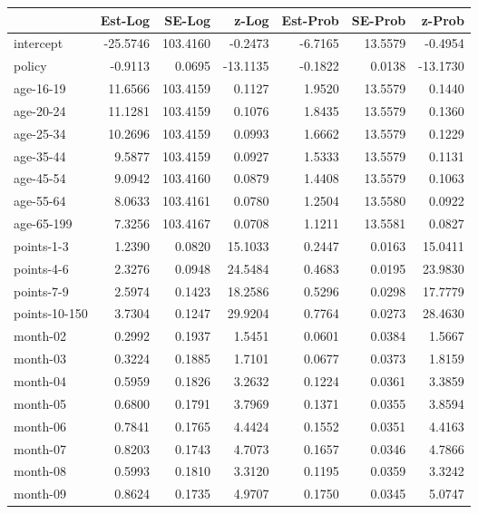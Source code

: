 \documentclass[10pt]{article}
\begin{document}
\begin{table}[ht]
\centering
\begin{tabular}{lrrrrrr}
  \hline
 & Est-Log & SE-Log & z-Log & Est-Prob & SE-Prob & z-Prob \\ 
  \hline
intercept & -25.5746 & 103.4160 & -0.2473 & -6.7165 & 13.5579 & -0.4954 \\ 
  policy & -0.9113 & 0.0695 & -13.1135 & -0.1822 & 0.0138 & -13.1730 \\ 
  age-16-19 & 11.6566 & 103.4159 & 0.1127 & 1.9520 & 13.5579 & 0.1440 \\ 
  age-20-24 & 11.1281 & 103.4159 & 0.1076 & 1.8435 & 13.5579 & 0.1360 \\ 
  age-25-34 & 10.2696 & 103.4159 & 0.0993 & 1.6662 & 13.5579 & 0.1229 \\ 
  age-35-44 & 9.5877 & 103.4159 & 0.0927 & 1.5333 & 13.5579 & 0.1131 \\ 
  age-45-54 & 9.0942 & 103.4160 & 0.0879 & 1.4408 & 13.5579 & 0.1063 \\ 
  age-55-64 & 8.0633 & 103.4161 & 0.0780 & 1.2504 & 13.5580 & 0.0922 \\ 
  age-65-199 & 7.3256 & 103.4167 & 0.0708 & 1.1211 & 13.5581 & 0.0827 \\ 
  points-1-3 & 1.2390 & 0.0820 & 15.1033 & 0.2447 & 0.0163 & 15.0411 \\ 
  points-4-6 & 2.3276 & 0.0948 & 24.5484 & 0.4683 & 0.0195 & 23.9830 \\ 
  points-7-9 & 2.5974 & 0.1423 & 18.2586 & 0.5296 & 0.0298 & 17.7779 \\ 
  points-10-150 & 3.7304 & 0.1247 & 29.9204 & 0.7764 & 0.0273 & 28.4630 \\ 
  month-02 & 0.2992 & 0.1937 & 1.5451 & 0.0601 & 0.0384 & 1.5667 \\ 
  month-03 & 0.3224 & 0.1885 & 1.7101 & 0.0677 & 0.0373 & 1.8159 \\ 
  month-04 & 0.5959 & 0.1826 & 3.2632 & 0.1224 & 0.0361 & 3.3859 \\ 
  month-05 & 0.6800 & 0.1791 & 3.7969 & 0.1371 & 0.0355 & 3.8594 \\ 
  month-06 & 0.7841 & 0.1765 & 4.4424 & 0.1552 & 0.0351 & 4.4163 \\ 
  month-07 & 0.8203 & 0.1743 & 4.7073 & 0.1657 & 0.0346 & 4.7866 \\ 
  month-08 & 0.5993 & 0.1810 & 3.3120 & 0.1195 & 0.0359 & 3.3242 \\ 
  month-09 & 0.8624 & 0.1735 & 4.9707 & 0.1750 & 0.0345 & 5.0747 \\ 

\end{tabular}
\end{table}
\end{document}
